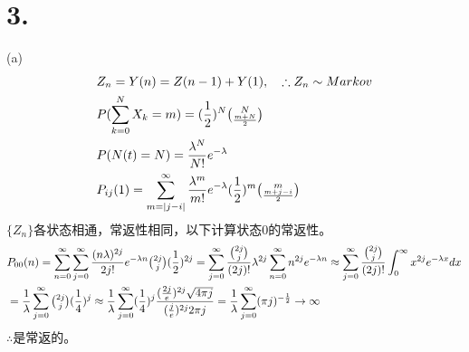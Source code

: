 \documentclass[UTF8]{ctexart}
\begin{document}
\section*{3.}
 (a)
\begin{equation*}
  \begin{aligned}
     & Z_n=Y(n)=Z(n-1)+Y(1),\quad\therefore Z_n\sim Markov                                 \\
     & P(\sum\limits_{k=0}^N X_k=m)=(\frac{1}{2})^N\tbinom{N}{\frac{m+N}{2}}               \\
     & P(N(t)=N)=\frac{\lambda^N}{N!}e^{-\lambda}                                          \\
     & P_{ij}(1)=\sum\limits_{m=\lvert j-i\rvert}^{\infty}\frac{\lambda^m}{m!}e^{-\lambda}
    (\frac{1}{2})^m\tbinom{m}{\frac{m+j-i}{2}}                                             \\
  \end{aligned}
\end{equation*}
$\{Z_n\}$各状态相通，常返性相同，以下计算状态0的常返性。
\begin{equation*}
  \begin{aligned}
     & P_{00}(n)=\sum\limits_{n=0}^\infty\sum\limits_{j=0}^\infty\frac{(n\lambda)^{2j}}{2j!}
    e^{-\lambda n}\tbinom{2j}{j}(\frac{1}{2})^{2j}
    =\sum\limits_{j=0}^\infty\frac{\tbinom{2j}{j}}{(2j)!}\lambda^{2j}\sum\limits_{n=0}^\infty
    n^{2j}e^{-\lambda n}
    \approx\sum\limits_{j=0}^\infty\frac{\tbinom{2j}{j}}{(2j)!}\int_0^\infty x^{2j}e^{-\lambda x}dx \\
     & =\frac{1}{\lambda}\sum\limits_{j=0}^\infty\tbinom{2j}{j}(\frac{1}{4})^{j}
    \approx\frac{1}{\lambda}\sum\limits_{j=0}^\infty(\frac{1}{4})^{j}
    \frac{(\frac{2j}{e})^{2j}\sqrt{4\pi j}}{(\frac{j}{e})^{2j}2\pi j}
    =\frac{1}{\lambda}\sum\limits_{j=0}^\infty(\pi j)^{-\frac{1}{2}}\to\infty
  \end{aligned}
\end{equation*}
$\therefore$是常返的。
\end{document}
